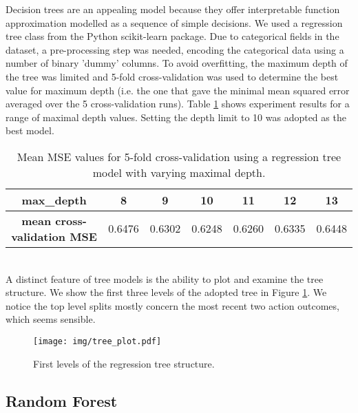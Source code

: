 \documentclass{sfuthesis}
\begin{document}
	Decision trees are an appealing model because they offer interpretable function approximation modelled as a sequence of simple decisions. We used a regression tree class from the Python scikit-learn package. Due to categorical fields in the dataset, a pre-processing step was needed, encoding the categorical data using a number of binary 'dummy' columns. To avoid overfitting, the maximum depth of the tree was limited and 5-fold cross-validation was used to determine the best value for maximum depth (i.e. the one that gave the minimal mean squared error averaged over the 5 cross-validation runs). Table \ref{tab:tree-mse} shows experiment results for a range of maximal depth values. Setting the depth limit to 10 was adopted as the best model.
	\begin{table}[h]
		\centering
		\begin{tabular}{c|cccccc}
			\textbf{max\_depth}                & 8      & 9      & 10     & 11     & 12     & 13     \\ \hline
			\textbf{mean cross-validation MSE} & 0.6476 & 0.6302 & 0.6248 & 0.6260 & 0.6335 & 0.6448
		\end{tabular}
		\caption{Mean MSE values for 5-fold cross-validation using a regression tree model with varying maximal depth.}
		\label{tab:tree-mse}
	\end{table}
	\\A distinct feature of tree models is the ability to plot and examine the tree structure. We show the first three levels of the adopted tree in Figure \ref{fig:tree-plot}. We notice the top level splits mostly concern the most recent two action outcomes, which seems sensible.
	\begin{figure}[h]
		\texttt{[image: img/tree\_plot.pdf]}
		\caption{First levels of the regression tree structure.}
		\label{fig:tree-plot}
	\end{figure}
	
	\subsection{Random Forest}
	
\end{document}
